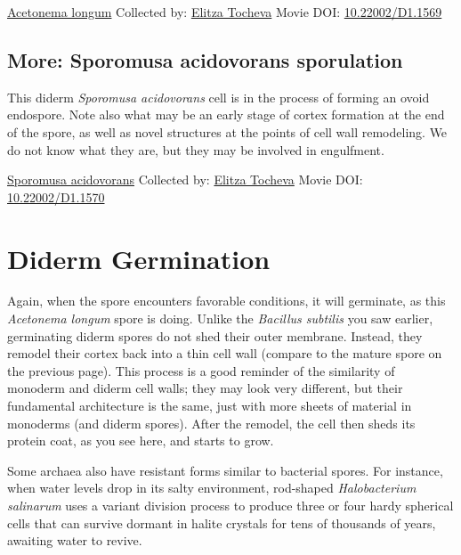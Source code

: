 \documentclass[]{tufte-book}
\begin{document}
\hypertarget{htmlwidget-73d32ef73d1e75b81399}{}

\label{fig:8-10b}\protect\hyperlink{tree}{Acetonema longum} Collected by: \protect\hyperlink{elitza_tocheva}{Elitza Tocheva} Movie DOI: \href{https://doi.org/10.22002/D1.1569}{10.22002/D1.1569}

\hypertarget{Sporomusa_acidovorans_sporulation}{%
\subsection*{More: Sporomusa acidovorans sporulation}\label{Sporomusa_acidovorans_sporulation}}

This diderm \emph{Sporomusa acidovorans} cell is in the process of forming an ovoid endospore. Note also what may be an early stage of cortex formation at the end of the spore, as well as novel structures at the points of cell wall remodeling. We do not know what they are, but they may be involved in engulfment.



\hypertarget{htmlwidget-5e05784abfe906127682}{}

\label{fig:8-10c}\protect\hyperlink{tree}{Sporomusa acidovorans} Collected by: \protect\hyperlink{elitza_tocheva}{Elitza Tocheva} Movie DOI: \href{https://doi.org/10.22002/D1.1570}{10.22002/D1.1570}

\hypertarget{diderm-germination}{%
\section{Diderm Germination}\label{diderm-germination}}

Again, when the spore encounters favorable conditions, it will germinate, as this \emph{Acetonema longum} spore is doing. Unlike the \emph{Bacillus subtilis} you saw earlier, germinating diderm spores do not shed their outer membrane. Instead, they remodel their cortex back into a thin cell wall (compare to the mature spore on the previous page). This process is a good reminder of the similarity of monoderm and diderm cell walls; they may look very different, but their fundamental architecture is the same, just with more sheets of material in monoderms (and diderm spores). After the remodel, the cell then sheds its protein coat, as you see here, and starts to grow.

Some archaea also have resistant forms similar to bacterial spores. For instance, when water levels drop in its salty environment, rod-shaped \emph{Halobacterium salinarum} uses a variant division process to produce three or four hardy spherical cells that can survive dormant in halite crystals for tens of thousands of years, awaiting water to revive.
\end{document}
